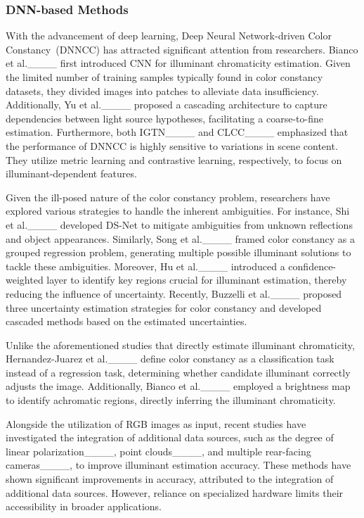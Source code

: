 \subsubsection{DNN-based Methods} \label{sec2.2.2}
\par With the advancement of deep learning, Deep Neural Network-driven Color Constancy~(DNNCC) has attracted significant attention from researchers.
Bianco et al.____ first introduced CNN for illuminant chromaticity estimation. Given the limited number of training samples typically found in color constancy datasets, they divided images into patches to alleviate data insufficiency.
Additionally, Yu et al.____ proposed a cascading architecture to capture dependencies between light source hypotheses, facilitating a coarse-to-fine estimation. Furthermore, both IGTN____ and CLCC____ emphasized that the performance of DNNCC is highly sensitive to variations in scene content. They utilize metric learning and contrastive learning, respectively, to focus on illuminant-dependent features. 
\par Given the ill-posed nature of the color constancy problem, researchers have explored various strategies to handle the inherent ambiguities. For instance, Shi et al.____ developed DS-Net to mitigate ambiguities from unknown reflections and object appearances. Similarly, Song et al.____ framed color constancy as a grouped regression problem, generating multiple possible illuminant solutions to tackle these ambiguities. Moreover, Hu et al.____ introduced a confidence-weighted layer to identify key regions crucial for illuminant estimation, thereby reducing the influence of uncertainty. Recently, Buzzelli et al.____ proposed three uncertainty estimation strategies for color constancy and developed cascaded methods based on the estimated uncertainties.
\par Unlike the aforementioned studies that directly estimate illuminant chromaticity, Hernandez-Juarez et al.____ define color constancy as a classification task instead of a regression task, determining whether candidate illuminant correctly adjusts the image. 
Additionally, Bianco et al.____ employed a brightness map to identify achromatic regions, directly inferring the illuminant chromaticity.
\par Alongside the utilization of RGB images as input, recent studies have investigated the integration of additional data sources, such as the degree of linear polarization____, point clouds____, and multiple rear-facing cameras____, to improve illuminant estimation accuracy. These methods have shown significant improvements in accuracy, attributed to the integration of additional data sources. However, reliance on specialized hardware limits their accessibility in broader applications.
